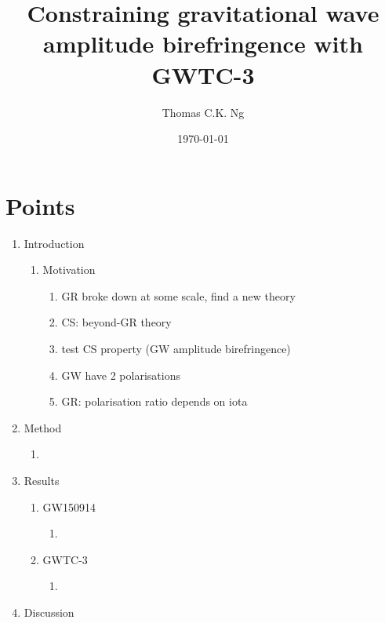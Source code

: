 \documentclass[twocolumn]{aastex631}
\begin{document}
\title{Constraining gravitational wave amplitude birefringence with GWTC-3}

\author{Thomas C.K. Ng}

\date{\today}

\begin{abstract}
    
\end{abstract}

\section{Points}

\begin{enumerate}
    \item Introduction
    \begin{enumerate}
        \item Motivation
        \begin{enumerate}
            \item GR broke down at some scale, find a new theory
            \item CS: beyond-GR theory
            \item test CS property (GW amplitude birefringence)
            \item GW have 2 polarisations
            \item GR: polarisation ratio depends on iota
        \end{enumerate}
    \end{enumerate}
    \item Method
    \begin{enumerate}
        \item
    \end{enumerate}
    \item Results
    \begin{enumerate}
        \item GW150914
        \begin{enumerate}
            \item
        \end{enumerate}
        \item GWTC-3
        \begin{enumerate}
            \item
        \end{enumerate}
    \end{enumerate}
    \item Discussion
    \begin{enumerate}

\end{enumerate}
\end{enumerate}
\end{document}
